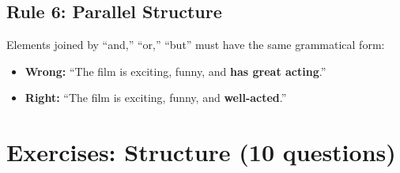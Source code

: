 \documentclass[10pt,a4paper]{article}
\begin{document}
\subsection*{Rule 6: Parallel Structure}

Elements joined by ``and,'' ``or,'' ``but'' must have the same
grammatical form:

\begin{itemize}[nosep]
\item \textbf{Wrong:} ``The film is exciting, funny, and
\textbf{has great acting}.''
\item \textbf{Right:} ``The film is exciting, funny, and
\textbf{well-acted}.''
\end{itemize}

\section*{Exercises: Structure (10 questions)}
\end{document}
